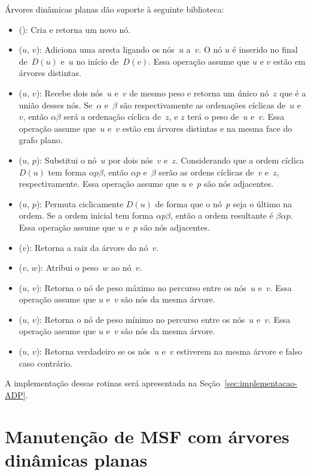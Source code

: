 Árvores dinâmicas planas dão suporte à seguinte biblioteca:
\begin{itemize}
\item \LCOMakeNode(): Cria e retorna um novo nó.
\item \LCOLink($u$, $v$): Adiciona uma aresta ligando os nós~$u$ a~$v$.
O nó $u$ é inserido no final de~$D(u)$ e~$u$ no início de~$D(v)$.
Essa operação assume que $u$ e $v$ estão em árvores distintas.
\item \LCOMerge($u$, $v$): Recebe dois nós~$u$ e~$v$ de mesmo peso e retorna um único nó~$z$ que é a união desses nós.
Se~$\alpha$ e~$\beta$ são respectivamente as ordenações cíclicas de~$u$ e~$v$, então $\alpha\beta$ será a ordenação cíclica de~$z$, e $z$ terá o peso de~$u$ e~$v$. 
Essa operação assume que~$u$ e~$v$ estão em árvores distintas e na mesma face do grafo plano.
\item \LCOSplit($u$, $p$): Substitui o nó~$u$ por dois nós~$v$ e~$z$.
Considerando que a ordem cíclica $D(u)$ tem forma $\alpha p\beta$, então $\alpha p$ e~$\beta$ serão as ordens cíclicas de~$v$ e~$z$, respectivamente.
Essa operação assume que $u$ e~$p$ são nós adjacentes.
\item \LCOCycle($u$, $p$): Permuta ciclicamente $D(u)$ de forma que o nó~$p$ seja o último na ordem.
Se a ordem inicial tem forma $\alpha p \beta$, então a ordem resultante é $\beta\alpha p$.
Essa operação assume que $u$ e~$p$ são nós adjacentes.
\item \LCORoot($v$): Retorna a raiz da árvore do nó~$v$.
\item \LCOAddCost($v$, $w$): Atribui o peso~$w$ ao nó~$v$.
\item \LCOMax($u$, $v$): Retorna o nó de peso máximo no percurso entre os nós~$u$ e~$v$.
Essa operação assume que $u$ e~$v$ são nós da mesma árvore.
\item \LCOMin($u$, $v$): Retorna o nó de peso mínimo no percurso entre os nós~$u$ e~$v$.
Essa operação assume que $u$ e~$v$ são nós da mesma árvore.
\item \LCOConnected($u$, $v$): Retorna verdadeiro se os nós~$u$ e~$v$ estiverem na mesma árvore e falso caso contrário.
\end{itemize}

A implementação dessas rotinas será apresentada na Seção~\ref{sec:implementacao-ADP}.

\section{Manutenção de MSF com árvores dinâmicas planas}

